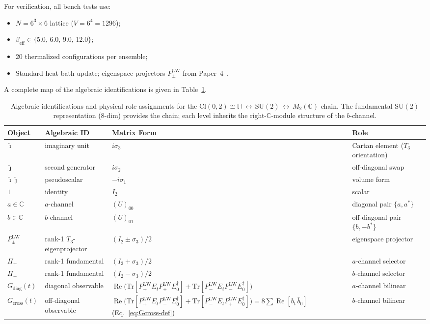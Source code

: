 \documentclass[12pt]{article}
\numberwithin{equation}{section}
\theoremstyle{plain}
\theoremstyle{definition}
\theoremstyle{remark}
\newcommand{\cl}{\mathrm{Cl}}              %
\newcommand{\su}{\mathrm{SU}}              %
\newcommand{\tr}{\mathrm{Tr}}              %
\newcommand{\Cplx}{\mathbb{C}}             %
\newcommand{\HH}{\mathbb{H}}               %
\newcommand{\ihat}{\hat{\imath}}           %
\newcommand{\jhat}{\hat{\jmath}}           %
\newcommand{\Gdiag}{G_{\mathrm{diag}}}     %
\newcommand{\Gcross}{G_{\mathrm{cross}}}   %
\newcommand{\PLW}{P^{\mathrm{LW}}}         %
\newcommand{\Pip}{\Pi_{+}}                 %
\newcommand{\Pim}{\Pi_{-}}                 %
\begin{document}
	For verification, all bench tests use:
	\begin{itemize}
		\item $N = 6^{3}\times 6$ lattice ($V = 6^{4} = 1296$);
		\item $\beta_{\mathrm{eff}}\in\{5.0,\,6.0,\,9.0,\,12.0\}$;
		\item 20 thermalized configurations per ensemble;
		\item Standard heat-bath update; eigenspace projectors $\PLW_\pm$
		from Paper~4~\cite{FirestoneP4}.
	\end{itemize}
	
	A complete map of the algebraic identifications is given in
	Table~\ref{tab:algebraic-ID}.
	
	\begin{table}[ht]
		\centering
		\caption{Algebraic identifications and physical role assignments
			for the $\cl(0,2)\cong\HH\,\leftrightarrow\,\su(2)\,
			\leftrightarrow\,M_2(\Cplx)$ chain.  The fundamental $\su(2)$
			representation (8-dim) provides the chain; each level inherits
			the right-$\Cplx$-module structure of the $b$-channel.}
		\label{tab:algebraic-ID}
		\footnotesize
		\setlength{\tabcolsep}{5pt}
		\begin{tabular}{@{}llll@{}}
			\toprule
			\textbf{Object} & \textbf{Algebraic ID}
			& \textbf{Matrix Form} & \textbf{Role}\\
			\midrule
			$\ihat$ & imaginary unit & $i\sigma_3$
			& Cartan element ($T_3$ orientation)\\
			$\jhat$ & second generator & $i\sigma_2$
			& off-diagonal swap\\
			$\ihat\jhat$ & pseudoscalar & $-i\sigma_1$
			& volume form\\
			$1$ & identity & $I_2$
			& scalar\\
			$a\in\Cplx$ & $a$-channel & $(U)_{00}$
			& diagonal pair $\{a,a^*\}$\\
			$b\in\Cplx$ & $b$-channel & $(U)_{01}$
			& off-diagonal pair $\{b,-b^*\}$\\
			$\PLW_\pm$ & rank-1 $T_3$-eigenprojector
			& $(I_2 \pm \sigma_3)/2$ & eigenspace projector\\
			$\Pip$ & rank-1 fundamental & $(I_2 + \sigma_3)/2$
			& $a$-channel selector\\
			$\Pim$ & rank-1 fundamental & $(I_2 - \sigma_3)/2$
			& $b$-channel selector\\
			$\Gdiag(t)$ & diagonal observable
			& $\operatorname{Re}\bigl(\tr[\PLW_+ E_t \PLW_+ E_0^{\dagger}]
			+ \tr[\PLW_- E_t \PLW_- E_0^{\dagger}]\bigr)$
			& $a$-channel bilinear\\
			$\Gcross(t)$ & off-diagonal observable
			& $\operatorname{Re}\bigl(\tr[\PLW_+ E_t \PLW_- E_0^{\dagger}]
			+ \tr[\PLW_- E_t \PLW_+ E_0^{\dagger}]\bigr)
			= 8\!\sum\operatorname{Re}[b_t\,\bar{b}_0]$
			\quad(Eq.~\ref{eq:Gcross-def})
			& $b$-channel bilinear\\
			\bottomrule
		\end{tabular}
	\end{table}
	
\end{document}
